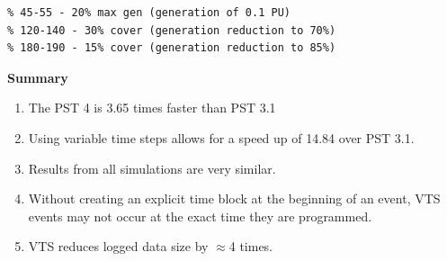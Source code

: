 \begin{center}
\begin{minipage}{.47\linewidth}
\begin{itemize}
\begin{Verbatim}[fontsize=\scriptsize]
% cloud cover events
% 45-55 - 20% max gen (generation of 0.1 PU)
% 120-140 - 30% cover (generation reduction to 70%)
% 180-190 - 15% cover (generation reduction to 85%)
\end{Verbatim}
\end{itemize}
\end{minipage}

\end{center}

\textbf{Summary} 
\begin{enumerate}
 em
\item The PST 4 is 3.65 times faster than PST 3.1
\item Using variable time steps allows for a speed up of 14.84 over PST 3.1.
\item Results from all simulations are very similar.
\item Without creating an explicit time block at the beginning of an event, VTS events may not occur at the exact time they are programmed.
\item VTS reduces logged data size by $\approx$4 times.
\end{enumerate}


\begin{table}[!ht]
	



\end{table}


